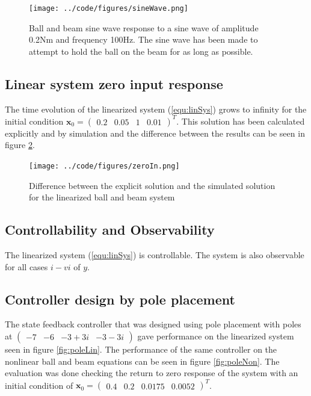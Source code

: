 \documentclass[a4paper, titlepage]{article}
\begin{document}
\begin{figure}[H]
\center
\texttt{[image: ../code/figures/sineWave.png]}
\caption{Ball and beam sine wave response to a sine wave of amplitude 0.2Nm and frequency 100Hz. The sine wave has been made to attempt to hold the ball on the beam for as long as possible.}
\label{fig:sineWave}
\end{figure}

\subsection{Linear system zero input response}
The time evolution of the linearized system (\ref{equ:linSys}) grows to infinity for the initial condition $\textbf{x}_0 = \begin{pmatrix} 0.2 & 0.05 & 1 & 0.01 \end{pmatrix}^T$.
This solution has been calculated explicitly and by simulation and the difference between the results can be seen in figure \ref{fig:zeroIn}.

\begin{figure}[H]
\center
\texttt{[image: ../code/figures/zeroIn.png]}
\caption{Difference between the explicit solution and the simulated solution for the linearized ball and beam system}
\label{fig:zeroIn}
\end{figure}

\subsection{Controllability and Observability}
The linearized system (\ref{equ:linSys}) is controllable.
The system is also observable for all cases $i - vi$ of $y$.

\subsection{Controller design by pole placement}
The state feedback controller that was designed using pole placement with poles at  $\begin{pmatrix} -7 & -6 & -3+3i & -3-3i \end{pmatrix}$ gave performance on the linearized system seen in figure \ref{fig:poleLin}.
The performance of the same controller on the nonlinear ball and beam equations can be seen in figure \ref{fig:poleNon}.
The evaluation was done checking the return to zero response of the system with an initial condition of $\textbf{x}_0 = \begin{pmatrix} 0.4 & 0.2 & 0.0175 & 0.0052 \end{pmatrix}^T$.
\end{document}
